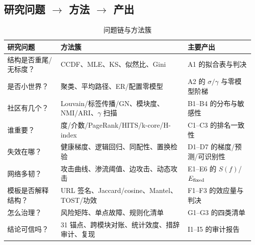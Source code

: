 \subsection{研究问题 \(\to\) 方法 \(\to\) 产出}

\begin{table}[H]
\centering
\caption{问题链与方法簇}
\small
\begin{tabularx}{\textwidth}{@{}p{}p{}X@{}}
\toprule
研究问题 & 方法簇 & 主要产出 \\
\midrule
结构是否重尾/无标度？ & CCDF、MLE、KS、似然比、Gini & A1 的拟合表与判决 \\
是否小世界？ & 聚类、平均路径、ER/配置零模型 & A2 的 \(\sigma/\gamma\) 与零模型阶梯 \\
社区有几个？ & Louvain/标签传播/GN、模块度、NMI/ARI、\(\gamma\) 扫描 & B1--B4 的分布与敏感性 \\
谁重要？ & 度/介数/PageRank/HITS/k-core/H-index & C1--C3 的排名一致性 \\
失效在哪？ & 健康梯度、逻辑回归、同配性、置换检验 & D1--D7 的梯度/预测/可识别性 \\
网络多韧？ & 攻击曲线、渗流阈值、边攻击、动态攻击 & E1--E6 的 \(S(f)\)/\(E_{\mathrm{fixed}}\) \\
模板是否解释结构？ & URL 签名、Jaccard/cosine、Mantel、TOST/功效 & F1--F3 的效应量与判决 \\
怎么治理？ & 风险矩阵、单点故障、规则化清单 & G1--G3 的四类清单 \\
结论可信吗？ & 31 锚点、跨模块对账、统计效度、措辞审计、复现 & I1--I5 的审计报告 \\
\bottomrule
\end{tabularx}
\end{table}
